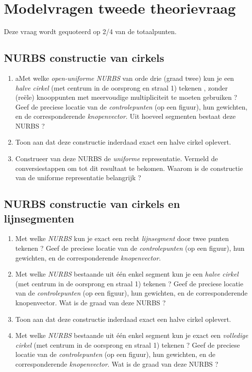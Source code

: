 \documentclass{report}
\begin{document}
	\chapter{Modelvragen tweede theorievraag}
	Deze vraag wordt gequoteerd op 2/4 van de totaalpunten.
	
	\section{NURBS constructie van cirkels }
	\begin{enumerate}
		\item aMet welke \textit{open-uniforme NURBS} van orde drie (graad twee) kun je een \textit{halve cirkel} (met centrum in de oorsprong en straal 1) tekenen , zonder (reële) knooppunten met meervoudige multipliciteit te moeten gebruiken ? Geef de preciese locatie van de \textit{controlepunten} (op een figuur), hun gewichten, en de corresponderende \textit{knopenvector}. Uit hoeveel segmenten bestaat deze NURBS ?
		
		\item Toon aan dat deze constructie inderdaad exact een halve cirkel oplevert.
		
		\item Construeer van deze NURBS de \textit{uniforme} representatie. Vermeld de conversiestappen om tot dit resultaat te bekomen. Waarom is de constructie van de uniforme representatie belangrijk ?
	\end{enumerate}

	\section{NURBS constructie van cirkels en lijnsegmenten  }
	\begin{enumerate}
		\item Met welke \textit{NURBS} kun je exact een recht \textit{lijnsegment} door twee punten tekenen ? Geef de preciese locatie van de \textit{controlepunten} (op een figuur), hun gewichten, en de corresponderende \textit{knopenvector}.
		
		\item Met welke \textit{NURBS} bestaande uit één enkel segment kun je een \textit{halve cirkel} (met centrum in de oorsprong en straal 1) tekenen ? Geef de preciese locatie van de \textit{controlepunten} (op een figuur), hun gewichten, en de corresponderende knopenvector\textit{}. Wat is de graad van deze NURBS ?
		
		\item Toon aan dat deze constructie inderdaad exact een halve cirkel oplevert.
		
		\item Met welke \textit{NURBS} bestaande uit één enkel segment kun je exact een \textit{volledige cirkel} (met centrum in de oorsprong en straal 1) tekenen ? Geef de preciese locatie van de \textit{controlepunten} (op een figuur), hun gewichten, en de corresponderende \textit{knopenvector}. Wat is de graad van deze NURBS ?
	\end{enumerate}
\end{document}
